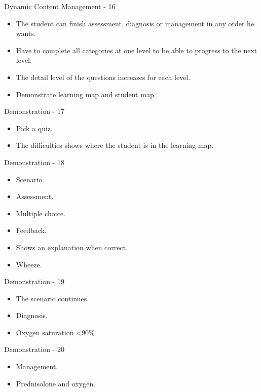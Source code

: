\documentclass{beamer}
\begin{document}
\begin{frame}{Dynamic Content Management - 16}
\begin{itemize}
	\item The student can finish assessment, diagnosis or management in any order he wants.
	\item Have to complete all categories at one level to be able to progress to the next level.
	\item The detail level of the questions increases for each level.
	\item Demonstrate learning map and student map. 
\end{itemize}
\end{frame}

\begin{frame}{Demonstration - 17}
\begin{itemize}
	\item Pick a quiz.
	\item The difficulties shows where the student is in the learning map.
\end{itemize}
\end{frame}

\begin{frame}{Demonstration - 18}
\begin{itemize}
	\item Scenario.
	\item Assessment.
	\item Multiple choice.
	\item Feedback.
	\item Shows an explanation when correct.
	\item Wheeze.
\end{itemize}
\end{frame}

\begin{frame}{Demonstration - 19}
\begin{itemize}
	\item The scenario continues.
	\item Diagnosis.
	\item Oxygen saturation <90\%
\end{itemize}
\end{frame}

\begin{frame}{Demonstration - 20}
\begin{itemize}
	\item Management.
	\item Prednisolone and oxygen.
\end{itemize}
\end{frame}
\end{document}
